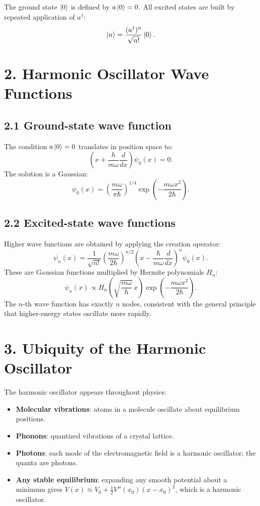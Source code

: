 \documentclass[12pt,a4paper]{article}
\begin{document}
The ground state $\ket{0}$ is defined by $a\ket{0} = 0$.  All excited states are built by repeated application of $a^\dagger$:
\[
    \ket{n} = \frac{(a^\dagger)^n}{\sqrt{n!}}\ket{0}.
\]

\section{2. Harmonic Oscillator Wave Functions}

\subsection{2.1 Ground-state wave function}

The condition $a\ket{0} = 0$ translates in position space to:
\[
    \left(x + \frac{\hbar}{m\omega}\frac{d}{dx}\right)\psi_0(x) = 0.
\]
The solution is a Gaussian:
\[
    \boxed{\psi_0(x) = \left(\frac{m\omega}{\pi\hbar}\right)^{1/4}\exp\left(-\frac{m\omega x^2}{2\hbar}\right).}
\]

\subsection{2.2 Excited-state wave functions}

Higher wave functions are obtained by applying the creation operator:
\[
    \psi_n(x) = \frac{1}{\sqrt{n!}}\left(\frac{m\omega}{2\hbar}\right)^{n/2}\left(x - \frac{\hbar}{m\omega}\frac{d}{dx}\right)^n \psi_0(x).
\]
These are Gaussian functions multiplied by Hermite polynomials $H_n$:
\[
    \psi_n(x) \propto H_n\!\left(\sqrt{\frac{m\omega}{\hbar}}\,x\right)\exp\left(-\frac{m\omega x^2}{2\hbar}\right).
\]
The $n$-th wave function has exactly $n$ nodes, consistent with the general principle that higher-energy states oscillate more rapidly.

\section{3. Ubiquity of the Harmonic Oscillator}

The harmonic oscillator appears throughout physics:
\begin{itemize}[nosep]
    \item \textbf{Molecular vibrations}: atoms in a molecule oscillate about equilibrium positions.
    \item \textbf{Phonons}: quantized vibrations of a crystal lattice.
    \item \textbf{Photons}: each mode of the electromagnetic field is a harmonic oscillator; the quanta are photons.
    \item \textbf{Any stable equilibrium}: expanding any smooth potential about a minimum gives $V(x) \approx V_0 + \tfrac{1}{2}V''(x_0)(x - x_0)^2$, which is a harmonic oscillator.
\end{itemize}
\end{document}
